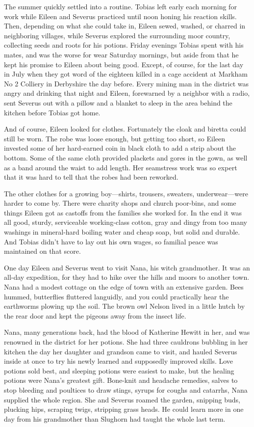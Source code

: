 The summer quickly settled into a routine. Tobias left early each morning for work while Eileen and Severus practiced until noon honing his reaction skills. Then, depending on what she could take in, Eileen sewed, washed, or charred in neighboring villages, while Severus explored the surrounding moor country, collecting seeds and roots for his potions. Friday evenings Tobias spent with his mates, and was the worse for wear Saturday mornings, but aside from that he kept his promise to Eileen about being good. Except, of course, for the last day in July when they got word of the eighteen killed in a cage accident at Markham No 2 Colliery in Derbyshire the day before. Every mining man in the district was angry and drinking that night and Eileen, forewarned by a neighbor with a radio, sent Severus out with a pillow and a blanket to sleep in the area behind the kitchen before Tobias got home.

And of course, Eileen looked for clothes. Fortunately the cloak and biretta could still be worn. The robe was loose enough, but getting too short, so Eileen invested some of her hard-earned coin in black cloth to add a strip about the bottom. Some of the same cloth provided plackets and gores in the gown, as well as a band around the waist to add length. Her seamstress work was so expert that it was hard to tell that the robes had been reworked.

The other clothes for a growing boy—shirts, trousers, sweaters, underwear—were harder to come by. There were charity shops and church poor-bins, and some things Eileen got as castoffs from the families she worked for. In the end it was all good, sturdy, serviceable working-class cotton, gray and dingy from too many washings in mineral-hard boiling water and cheap soap, but solid and durable. And Tobias didn't have to lay out his own wages, so familial peace was maintained on that score.

One day Eileen and Severus went to visit Nana, his witch grandmother. It was an all-day expedition, for they had to hike over the hills and moors to another town. Nana had a modest cottage on the edge of town with an extensive garden. Bees hummed, butterflies fluttered languidly, and you could practically hear the earthworms plowing up the soil. The brown owl Nelson lived in a little hutch by the rear door and kept the pigeons away from the insect life.

Nana, many generations back, had the blood of Katherine Hewitt in her, and was renowned in the district for her potions. She had three cauldrons bubbling in her kitchen the day her daughter and grandson came to visit, and hauled Severus inside at once to try his newly learned and supposedly improved skills. Love potions sold best, and sleeping potions were easiest to make, but the healing potions were Nana's greatest gift. Bone-knit and headache remedies, salves to stop bleeding and poultices to draw stings, syrups for coughs and catarrhs, Nana supplied the whole region. She and Severus roamed the garden, snipping buds, plucking hips, scraping twigs, stripping grass heads. He could learn more in one day from his grandmother than Slughorn had taught the whole last term.

